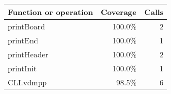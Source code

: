 \bigskip
\begin{longtable}{|l|r|r|}
\hline
Function or operation & Coverage & Calls \\
\hline
\hline
printBoard & 100.0\% & 2 \\
\hline
printEnd & 100.0\% & 1 \\
\hline
printHeader & 100.0\% & 2 \\
\hline
printInit & 100.0\% & 1 \\
\hline
\hline
CLI.vdmpp & 98.5\% & 6 \\
\hline
\end{longtable}

